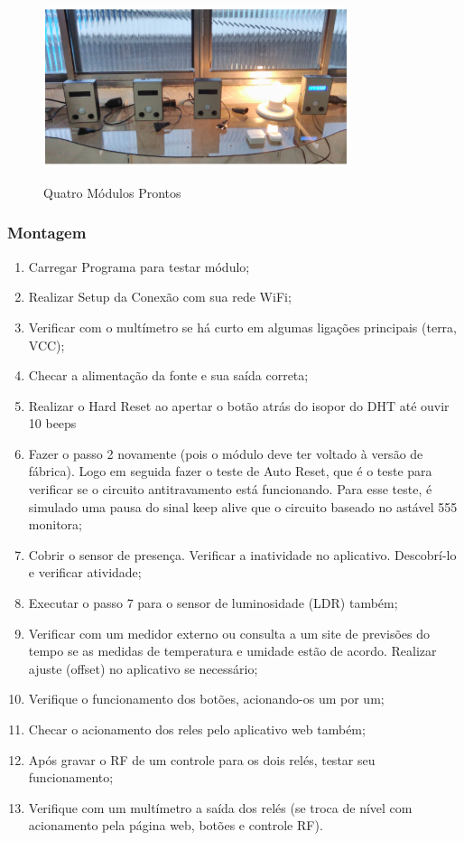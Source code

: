 \begin{enumerate}
	\begin{figure}[H]
		\centering
		\caption{Quatro Módulos Prontos}
		\includegraphics[width=0.8\textwidth]{QuatroModulos}
		\label{fig:QuatroModulos}
	\end{figure}

\end{enumerate}

\subsubsection {Montagem}
\begin{enumerate}
	\item Carregar Programa para testar módulo;
	\item Realizar Setup da Conexão com sua rede WiFi;
	\item Verificar com o multímetro se há curto em algumas ligações principais (terra, VCC);
	\item Checar a alimentação da fonte e sua saída correta;
	\item Realizar o Hard Reset ao apertar o botão atrás do isopor do DHT até ouvir 10 beeps
	\item Fazer o passo 2 novamente (pois o módulo deve ter voltado à versão de fábrica). Logo em seguida fazer o teste de Auto Reset, que é o teste para verificar se o circuito antitravamento está funcionando. Para esse teste, é simulado uma pausa do sinal keep alive que o circuito baseado no astável 555 monitora;
	\item Cobrir o sensor de presença. Verificar a inatividade no aplicativo. Descobrí-lo e verificar atividade;
	\item Executar o passo 7 para o sensor de luminosidade (LDR) também;
	\item Verificar com um medidor externo ou consulta a um site de previsões do tempo se as medidas de temperatura e umidade estão de acordo. Realizar ajuste (offset) no aplicativo se necessário;
	\item Verifique o funcionamento dos botões, acionando-os um por um;
	\item Checar o acionamento dos reles pelo aplicativo web também;
	\item Após gravar o RF de um controle para os dois relés, testar seu funcionamento;
	\item Verifique com um multímetro a saída dos relés (se troca de nível com acionamento pela página web, botões e controle RF).
\end{enumerate}